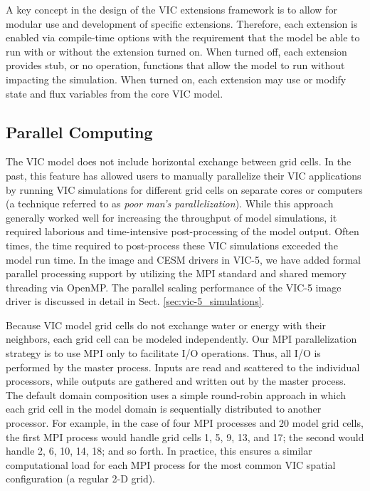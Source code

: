 \documentclass[gmd, manuscript]{copernicus}
\begin{document}
      A key concept in the design of the VIC extensions framework is to allow for modular use and development of specific extensions. Therefore, each extension is enabled via compile-time options with the requirement that the model be able to run with or without the extension turned on. When turned off, each extension provides stub, or no operation, functions that allow the model to run without impacting the simulation. When turned on, each extension may use or modify state and flux variables from the core VIC model.

  \subsection{Parallel Computing}
    \label{sec:parallel}
    The VIC model does not include horizontal exchange between grid cells. In the past, this feature has allowed users to manually parallelize their VIC applications by running VIC simulations for different grid cells on separate cores or computers (a technique referred to as \textit{poor man's parallelization}). While this approach generally worked well for increasing the throughput of model simulations, it required laborious and time-intensive post-processing of the model output. Often times, the time required to post-process these VIC simulations exceeded the model run time. In the image and CESM drivers in VIC-5, we have added formal parallel processing support by utilizing the MPI standard and shared memory threading via OpenMP. The parallel scaling performance of the VIC-5 image driver is discussed in detail in Sect. \ref{sec:vic-5_simulations}.

    Because VIC model grid cells do not exchange water or energy with their neighbors, each grid cell can be modeled independently. Our MPI parallelization strategy is to use MPI only to facilitate I/O operations. Thus, all I/O is performed by the master process. Inputs are read and scattered to the individual processors, while outputs are gathered and written out by the master process. The default domain composition uses a simple round-robin approach in which each grid cell in the model domain is sequentially distributed to another processor. For example, in the case of four MPI processes and 20 model grid cells, the first MPI process would handle grid cells 1, 5, 9, 13, and 17; the second would handle 2, 6, 10, 14, 18; and so forth. In practice, this ensures a similar computational load for each MPI process for the most common VIC spatial configuration (a regular 2-D grid).
\end{document}
